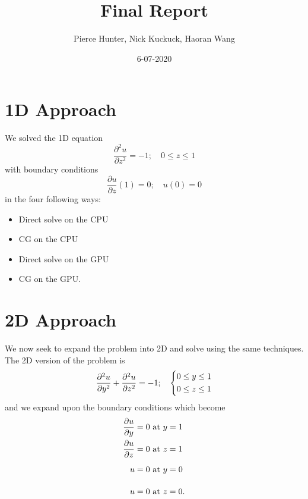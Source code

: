 \documentclass[11pt]{article}
\newcommand{\pd}[2]{\frac{\partial #1}{\partial #2}}
\begin{document}
\title{\textbf{Final Report}}
\author{Pierce Hunter, Nick Kuckuck, Haoran Wang}
\date{6-07-2020}
\maketitle
\section{1D Approach}
	We solved the 1D equation
	\begin{equation}
		\pd{^2u}{z^2} = -1; \quad 0\leq z\leq 1
	\end{equation}
	with boundary conditions
	\begin{equation}
		\pd{u}{z}\left(1\right) = 0; \quad u(0) = 0
	\end{equation}
	in the four following ways:
	\begin{itemize}
		\item Direct solve on the CPU
		\item CG on the CPU
		\item Direct solve on the GPU
		\item CG on the GPU.
	\end{itemize}
	\section{2D Approach}
	We now seek to expand the problem into 2D and solve using the same techniques. The 2D version of the problem is
	\begin{equation}
		\pd{^2u}{y^2} + \pd{^2u}{z^2} = -1; \quad \begin{dcases}
		0\leq y\leq 1\\
		0\leq z\leq 1
		\end{dcases}
	\end{equation}
	and we expand upon the boundary conditions which become
	\begin{align}
		\pd{u}{y} = 0&\text{ at }y=1\\
		\pd{u}{z} = 0&\text{ at }z=1\\
		u = 0&\text{ at }y=0\vphantom{\pd{u}{y}}\\
		u = 0&\text{ at }z=0\vphantom{\pd{u}{y}}.
	\end{align}
\end{document}
